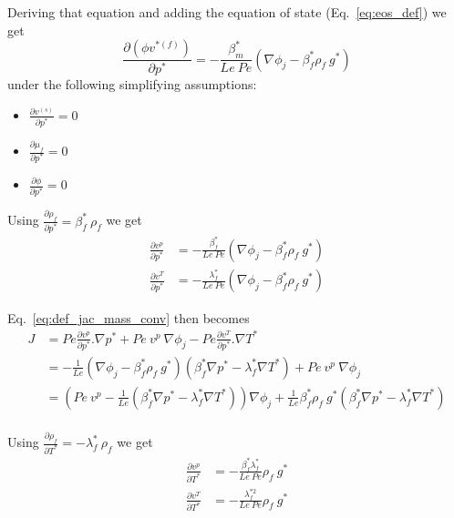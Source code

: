 \documentclass[]{scrreprt}
\begin{document}
Deriving that equation and adding the equation of state (Eq.~\ref{eq:eos_def}) we get
\begin{equation}
  \frac{\partial (\phi v^{*(f)})}{\partial p^*} = -\frac{\beta^*_m}{Le\:Pe} \left(\nabla \phi_j - \beta^*_f\rho_f\:g^* \right)
\end{equation}
under the following simplifying assumptions:
\begin{itemize}
 \item $\frac{\partial v^{(s)}}{\partial p^*}=0$
 \item $\frac{\partial \mu_f}{\partial p^*}=0$
 \item $\frac{\partial \phi}{\partial p^*}=0$
\end{itemize}
Using $\frac{\partial \rho_f}{\partial p^*} = \beta^*_f \: \rho_f$ we get
\begin{subequations}
  \label{eq:derivatives_vT_vp}
  \begin{align}
     \frac{\partial v^p}{\partial p^*} &= -\frac{\beta^*_f}{Le\:Pe} \left(\nabla \phi_j - \beta^*_f\rho_f\:g^* \right) \\
  \frac{\partial v^T}{\partial p^*} &= -\frac{\lambda^*_f}{Le\:Pe} \left(\nabla \phi_j - \beta^*_f\rho_f\:g^* \right)
  \end{align}
\end{subequations}


Eq.~\ref{eq:def_jac_mass_conv} then becomes
\begin{subequations}
  \label{eq:jac_mass_conv1}
  \begin{align}
  J &= Pe \frac{\partial v^p}{\partial p^*}.\nabla p^*
  	+ Pe\:v^p\:\nabla \phi_j - Pe\frac{\partial v^T}{\partial p^*}.\nabla T^* \\ \nonumber
  	&= -\frac{1}{Le} \left(\nabla \phi_j - \beta^*_f\rho_f\:g^* \right) (\beta^*_f\nabla p^* - \lambda^*_f\nabla T^*) + Pe\:v^p\:\nabla \phi_j \\ \nonumber
  	&= \left( Pe\:v^p -\frac{1}{Le}(\beta^*_f\nabla p^* - \lambda^*_f\nabla T^*) \right)\nabla \phi_j + \frac{1}{Le} \beta^*_f\rho_f\:g^*(\beta^*_f\nabla p^* - \lambda^*_f\nabla T^*) \\ \nonumber
  \end{align}
\end{subequations}

Using $\frac{\partial \rho_f}{\partial T^*} = -\lambda^*_f \: \rho_f$ we get
\begin{subequations}
  \begin{align}
  \frac{\partial v^p}{\partial T^*} &= -\frac{\beta^*_f \lambda^*_f}{Le\:Pe} \rho_f\:g^* \\
  \frac{\partial v^T}{\partial T^*} &= -\frac{\lambda^{*2}_f}{Le\:Pe} \rho_f\:g^* \\
  \end{align}
\end{subequations}
\end{document}
